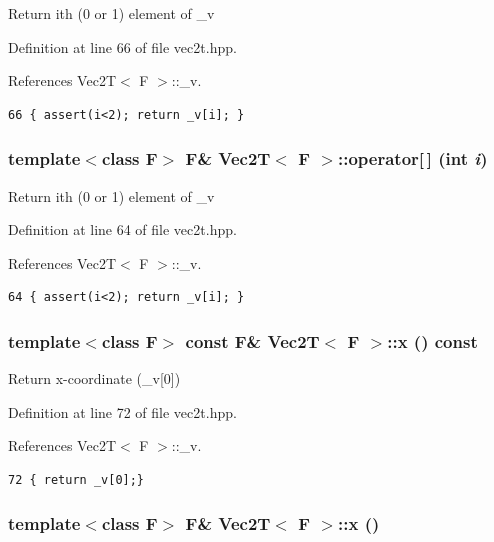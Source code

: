 Return ith (0 or 1) element of \_\-v 

Definition at line 66 of file vec2t.hpp.

References Vec2T$<$ F $>$::\_\-v.

\footnotesize\begin{verbatim}66 { assert(i<2); return _v[i]; }
\end{verbatim}\normalsize 


\subsubsection{\setlength{\rightskip}{0pt plus 5cm}template$<$class F$>$ F\& {\bf Vec2T}$<$ F $>$::operator[$\,$] (int {\em i})\hspace{0.3cm}{\tt  [inline]}}\label{classVec2T_afa3b3be64f86f689de4bf05a470fc17_afa3b3be64f86f689de4bf05a470fc17}


Return ith (0 or 1) element of \_\-v 

Definition at line 64 of file vec2t.hpp.

References Vec2T$<$ F $>$::\_\-v.

\footnotesize\begin{verbatim}64 { assert(i<2); return _v[i]; }
\end{verbatim}\normalsize 


\subsubsection{\setlength{\rightskip}{0pt plus 5cm}template$<$class F$>$ const F\& {\bf Vec2T}$<$ F $>$::x () const\hspace{0.3cm}{\tt  [inline]}}\label{classVec2T_48b18a21fef9634230ceceb1ae474d7b_48b18a21fef9634230ceceb1ae474d7b}


Return x-coordinate (\_\-v[0]) 

Definition at line 72 of file vec2t.hpp.

References Vec2T$<$ F $>$::\_\-v.

\footnotesize\begin{verbatim}72 { return _v[0];}
\end{verbatim}\normalsize 


\subsubsection{\setlength{\rightskip}{0pt plus 5cm}template$<$class F$>$ F\& {\bf Vec2T}$<$ F $>$::x ()\hspace{0.3cm}{\tt  [inline]}}\label{classVec2T_21935a98327babfb12a213be3f675109_21935a98327babfb12a213be3f675109}



